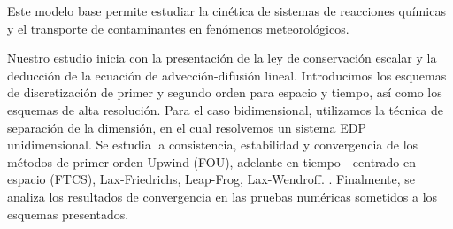 Este modelo base permite estudiar la cinética de sistemas de
reacciones químicas y el transporte de contaminantes en fenómenos
meteorológicos.

Nuestro estudio inicia con la presentación de la ley de conservación
escalar y la deducción de la ecuación de advección-difusión lineal.
Introducimos los esquemas de discretización de primer y segundo orden
para espacio y tiempo, así como los esquemas de alta resolución.
Para el caso bidimensional, utilizamos la técnica de separación
de la dimensión, en el cual resolvemos un sistema EDP unidimensional.
Se estudia la consistencia, estabilidad y convergencia de los métodos
de primer orden Upwind (FOU), adelante en tiempo - centrado en
espacio (FTCS), Lax-Friedrichs, Leap-Frog, Lax-Wendroff.
.
Finalmente, se analiza los resultados de convergencia en las pruebas
numéricas sometidos a los esquemas presentados.

